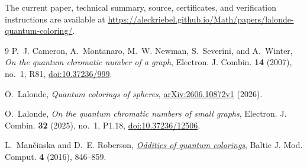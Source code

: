 \documentclass[11pt]{article}
\begin{document}
\medskip
\noindent
The current paper, technical summary, source, certificates, and verification
instructions are available at
\url{https://aleckriebel.github.io/Math/papers/lalonde-quantum-coloring/}.

\begin{thebibliography}{9}
\footnotesize
\setlength{\itemsep}{0pt}
P.~J. Cameron, A.~Montanaro, M.~W. Newman, S.~Severini, and A.~Winter,
\emph{On the quantum chromatic number of a graph},
Electron. J. Combin. \textbf{14} (2007), no.~1, R81,
\href{https://doi.org/10.37236/999}{doi:10.37236/999}.

O.~Lalonde,
\emph{Quantum colorings of spheres},
\href{https://arxiv.org/abs/2606.10872}{arXiv:2606.10872v1} (2026).

O.~Lalonde,
\emph{On the quantum chromatic numbers of small graphs},
Electron. J. Combin. \textbf{32} (2025), no.~1, P1.18,
\href{https://doi.org/10.37236/12506}{doi:10.37236/12506}.

L.~Man\v{c}inska and D.~E. Roberson,
\href{https://doi.org/10.22364/bjmc.2016.4.4.16}{\emph{Oddities of quantum colorings}},
Baltic J. Mod. Comput. \textbf{4} (2016), 846--859.
\end{thebibliography}
\end{document}
